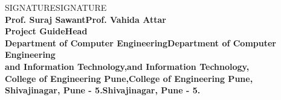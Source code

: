 \begin{center}		%

SIGNATURESIGNATURE\\
\normalsize{\bf{Prof. Suraj SawantProf. Vahida Attar\\
Project GuideHead}\\
Department of Computer EngineeringDepartment of Computer Engineering\\
and Information Technology,and Information Technology,\\
College of Engineering Pune,College of Engineering Pune,\\
Shivajinagar, Pune - 5.Shivajinagar, Pune - 5.}
\end{center}

